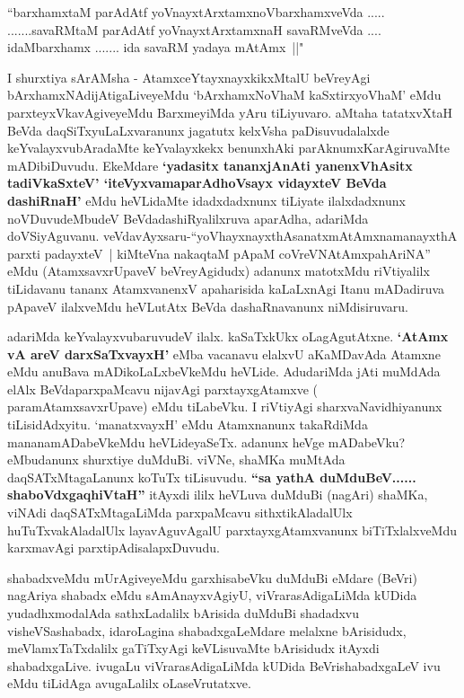 \begin{shl}
``barxhamxtaM parAdAtf yoV\s nayxtArxtamxnoVbarxhamxveVda .....
.......savaRMtaM parAdAtf yoV\s nayxtArxtamxnaH savaRMveVda ....
idaMbarxhamx ....... ida savaRM yadaya mAtAmx~||"
\end{shl}

\begin{artha}
I shurxtiya sArAMsha - AtamxceYtayxnayxkikxMtalU beVreyAgi
bArxhamxNAdijAtigaLiveyeMdu `bArxhamxNoV\s haM kaSxtirxyoV\s haM' eMdu parxteyxVkavAgiveyeMdu
 BarxmeyiMda yAru tiLiyuvaro. aMtaha tatatxvXtaH BeVda
daqSiTxyuLaLxvaranunx jagatutx kelxVsha paDisuvudalalxde
keYvalayxvubAradaMte keYvalayxkekx benunxhAki parAknumxKarAgiruvaMte
mADibiDuvudu. EkeMdare \textbf{`yadasitx tananxjAnAti yanenxVhAsitx tadiVkaSxteV' `iteVyxvamaparAdhoV\s sayx vidayxteV BeVda dashiRnaH'} eMdu heVLidaMte idadxdadxnunx
tiLiyate ilalxdadxnunx noVDuvudeMbudeV BeVdadashiRyalilxruva aparAdha,
adariMda doVSiyAguvanu. veVdavAyxsaru-``yoVhayxnayxthAsanatxmAtAmxnamanayxthA parxti padayxteV~| kiMteVna nakaqtaM pApaM coVreVNAtAmxpahAriNA'' eMdu (AtamxsavxrUpaveV
beVreyAgidudx) adanunx matotxMdu riVtiyalilx tiLidavanu tananx
AtamxvanenxV apaharisida kaLaLxnAgi Itanu mADadiruva pApaveV ilalxveMdu
heVLutAtx BeVda dashaRnavanunx niMdisiruvaru.

adariMda keYvalayxvubaruvudeV ilalx. kaSaTxkUkx
oLagAgutAtxne. \textbf{`AtAmx vA areV darxSaTxvayxH'} eMba vacanavu elalxvU aKaMDavAda Atamxne eMdu
anuBava mADikoLaLxbeVkeMdu heVLide. AdudariMda jAti muMdAda elAlx
BeVdaparxpaMcavu nijavAgi parxtayxgAtamxve ( paramAtamxsavxrUpave)
eMdu tiLabeVku. I riVtiyAgi sharxvaNavidhiyanunx
tiLisidAdxyitu. `manatxvayxH' eMdu Atamxnanunx takaRdiMda
mananamADabeVkeMdu heVLideyaSeTx. adanunx heVge mADabeVku? eMbudanunx
shurxtiye duMduBi. viVNe, shaMKa muMtAda daqSATxMtagaLanunx koTuTx
tiLisuvudu. \textbf{``sa yathA duMduBeV...... shaboVdxgaqhiVtaH''} itAyxdi ililx heVLuva duMduBi (nagAri) shaMKa, viNAdi
daqSATxMtagaLiMda parxpaMcavu sithxtikAladalUlx huTuTxvakAladalUlx
layavAguvAgalU parxtayxgAtamxvanunx biTiTxlalxveMdu karxmavAgi
parxtipAdisalapxDuvudu. 

shabadxveMdu mUrAgiveyeMdu garxhisabeVku duMduBi eMdare (BeVri)
 nagAriya shabadx eMdu sAmAnayxvAgiyU, viVrarasAdigaLiMda kUDida
yudadhxmodalAda sathxLadalilx bArisida duMduBi shadadxvu
visheVSashabadx, idaroLagina shabadxgaLeMdare melalxne bArisidudx,
meVlamxTaTxdalilx gaTiTxyAgi keVLisuvaMte bArisidudx itAyxdi
shabadxgaLive. ivugaLu viVrarasAdigaLiMda kUDida BeVrishabadxgaLeV ivu
eMdu tiLidAga avugaLalilx oLaseVrutatxve.


\end{artha}
